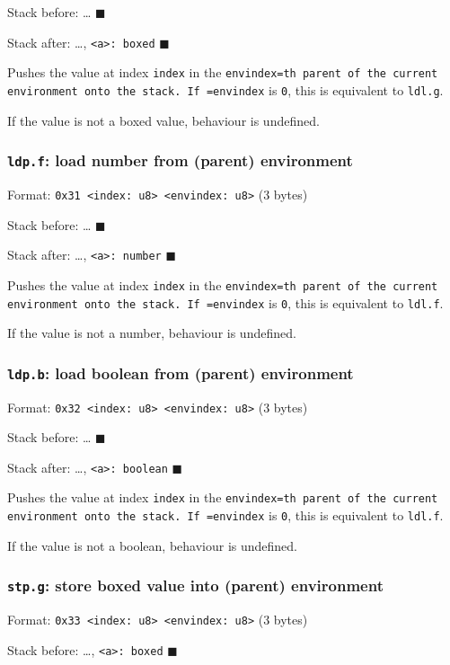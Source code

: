 Stack before: \ldots{} \(\blacksquare\)

Stack after: \ldots{}, \texttt{<a>: boxed} \(\blacksquare\)

Pushes the value at index \texttt{index} in the \texttt{envindex=th parent of the
current environment onto the stack. If =envindex} is \texttt{0}, this is
equivalent to \texttt{ldl.g}.

If the value is not a boxed value, behaviour is undefined.

\subsubsection{\texttt{ldp.f}: load number from (parent) environment}
\label{sec:orgf48099d}
Format: \texttt{0x31 <index: u8> <envindex: u8>} (3 bytes)

Stack before: \ldots{} \(\blacksquare\)

Stack after: \ldots{}, \texttt{<a>: number} \(\blacksquare\)

Pushes the value at index \texttt{index} in the \texttt{envindex=th parent of the
current environment onto the stack. If =envindex} is \texttt{0}, this is
equivalent to \texttt{ldl.f}.

If the value is not a number, behaviour is undefined.

\subsubsection{\texttt{ldp.b}: load boolean from (parent) environment}
\label{sec:org74003ff}
Format: \texttt{0x32 <index: u8> <envindex: u8>} (3 bytes)

Stack before: \ldots{} \(\blacksquare\)

Stack after: \ldots{}, \texttt{<a>: boolean} \(\blacksquare\)

Pushes the value at index \texttt{index} in the \texttt{envindex=th parent of the
current environment onto the stack. If =envindex} is \texttt{0}, this is
equivalent to \texttt{ldl.f}.

If the value is not a boolean, behaviour is undefined.

\subsubsection{\texttt{stp.g}: store boxed value into (parent) environment}
\label{sec:org3861b91}
Format: \texttt{0x33 <index: u8> <envindex: u8>} (3 bytes)

Stack before: \ldots{}, \texttt{<a>: boxed} \(\blacksquare\)

